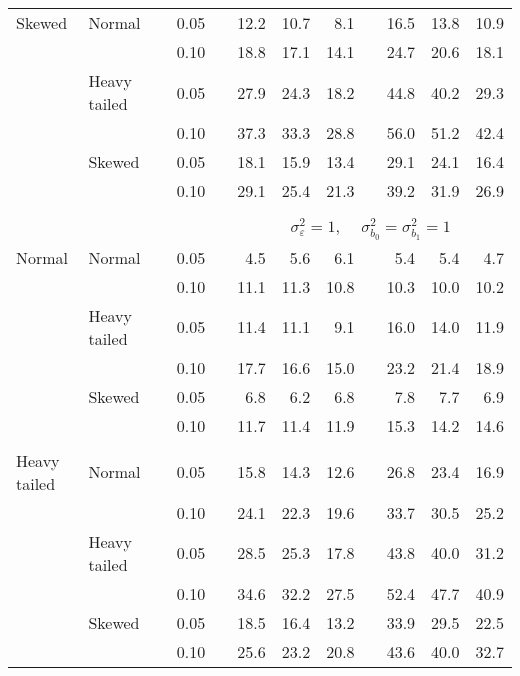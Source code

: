 \begin{table}[ht]
\begin{scriptsize}
\begin{center}
\begin{tabular}{ll p{.1cm} c p{.1cm} rrr p{.1cm} rrr}
Skewed       & Normal       && 0.05 &&   12.2 & 10.7 & 8.1 &   & 16.5 & 13.8 & 10.9 \\ 
             &              && 0.10 &&   18.8 & 17.1 & 14.1 &   & 24.7 & 20.6 & 18.1 \\ 
             & Heavy tailed && 0.05 &&   27.9 & 24.3 & 18.2 &   & 44.8 & 40.2 & 29.3 \\ 
             &              && 0.10 &&   37.3 & 33.3 & 28.8 &   & 56.0 & 51.2 & 42.4 \\ 
             & Skewed       && 0.05 &&   18.1 & 15.9 & 13.4 &   & 29.1 & 24.1 & 16.4 \\ 
             &              && 0.10 &&   29.1 & 25.4 & 21.3 &   & 39.2 & 31.9 & 26.9 \\ 


&&&&&&&&&&&\\
& && && \multicolumn{7}{c}{$\sigma_{\varepsilon}^2 = 1$, \ \ $\sigma_{b_0}^2 = \sigma_{b_1}^2 = 1$} \\ \cline{6-12}
\rowcolor{gray!20}Normal       & Normal       && 0.05 &&   4.5 & 5.6 & 6.1 &   & 5.4 & 5.4 & 4.7 \\ 
\rowcolor{gray!20}             &              && 0.10 &&   11.1 & 11.3 & 10.8 &   & 10.3 & 10.0 & 10.2 \\ 
\rowcolor{gray!20}             & Heavy tailed && 0.05 &&   11.4 & 11.1 & 9.1 &   & 16.0 & 14.0 & 11.9 \\ 
\rowcolor{gray!20}             &              && 0.10 &&   17.7 & 16.6 & 15.0 &   & 23.2 & 21.4 & 18.9 \\ 
\rowcolor{gray!20}             & Skewed       && 0.05 &&   6.8 & 6.2 & 6.8 &   & 7.8 & 7.7 & 6.9 \\ 
\rowcolor{gray!20}             &              && 0.10 &&   11.7 & 11.4 & 11.9 &   & 15.3 & 14.2 & 14.6 \\ 
&&&&&&&&&&&\\
Heavy tailed & Normal       && 0.05 &&   15.8 & 14.3 & 12.6 &   & 26.8 & 23.4 & 16.9 \\ 
             &              && 0.10 &&   24.1 & 22.3 & 19.6 &   & 33.7 & 30.5 & 25.2 \\ 
             & Heavy tailed && 0.05 &&   28.5 & 25.3 & 17.8 &   & 43.8 & 40.0 & 31.2 \\ 
             &              && 0.10 &&   34.6 & 32.2 & 27.5 &   & 52.4 & 47.7 & 40.9 \\ 
             & Skewed       && 0.05 &&   18.5 & 16.4 & 13.2 &   & 33.9 & 29.5 & 22.5 \\ 
             &              && 0.10 &&   25.6 & 23.2 & 20.8 &   & 43.6 & 40.0 & 32.7 \\ 

\end{tabular}
\end{center}
\end{scriptsize}
\end{table}
